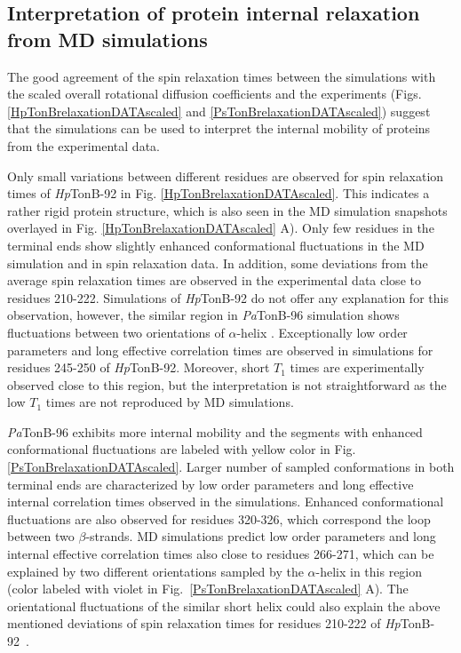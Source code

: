 \documentclass[journal=jpcbfk,manuscript=article]{achemso}
\begin{document}
\subsection{Interpretation of protein internal relaxation from MD simulations}
The good agreement of the spin relaxation times between the simulations
with the scaled overall rotational diffusion coefficients and
the experiments (Figs. \ref{HpTonBrelaxationDATAscaled} and \ref{PsTonBrelaxationDATAscaled})
suggest that the simulations can be used to interpret the internal
mobility of proteins from the experimental data.

Only small variations between different residues are observed
for spin relaxation times of {\it Hp}TonB-92 in Fig. \ref{HpTonBrelaxationDATAscaled}.
This indicates a rather rigid protein structure, which is also seen in
the MD simulation snapshots overlayed in Fig. \ref{HpTonBrelaxationDATAscaled} A).
Only few residues in the terminal ends show slightly
enhanced conformational fluctuations in the MD simulation and in
spin relaxation data. In addition, some deviations from the average spin relaxation times
are observed in the experimental data close to residues 210-222.
Simulations of {\it Hp}TonB-92 do not offer any explanation for this
observation, however, the similar region in {\it Pa}TonB-96 simulation shows 
fluctuations between two orientations of $\alpha$-helix \cite{oeemig17}.
Exceptionally low order parameters and long effective correlation times 
are observed in simulations for residues 245-250 of {\it Hp}TonB-92.
Moreover, short $T_1$ times are experimentally observed close to this region,
but the interpretation is not straightforward as the low $T_1$ times
are not reproduced by MD simulations.

{\it Pa}TonB-96 exhibits more internal mobility 
and the segments with enhanced conformational fluctuations are labeled with yellow color
in Fig. \ref{PsTonBrelaxationDATAscaled}.
Larger number of sampled conformations in both terminal ends
are characterized by low order parameters and long effective internal correlation times
observed in the simulations. 
Enhanced conformational fluctuations are also observed for residues 320-326,
which correspond the loop between two $\beta$-strands.
MD simulations predict low order parameters and long internal effective correlation
times also close to residues 266-271, which can be explained by  
two different orientations sampled by the $\alpha$-helix in this region
(color labeled with violet in Fig.~\ref{PsTonBrelaxationDATAscaled} A).
The orientational fluctuations of the similar short helix could also explain the above mentioned
deviations of spin relaxation times for residues 210-222 of {\it Hp}TonB-92~\cite{ciragan16}.
\end{document}
